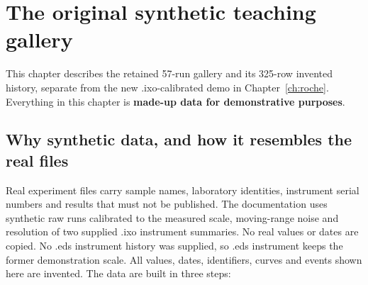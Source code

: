 \chapter{The original synthetic teaching gallery}\label{ch:data}

\begin{notebox}
This chapter describes the retained 57-run gallery and its 325-row invented history, separate from the new .ixo-calibrated demo in Chapter~\ref{ch:roche}. Everything in this chapter is \textbf{made-up data for demonstrative purposes}.
\end{notebox}

\section{Why synthetic data, and how it resembles the real files}
Real experiment files carry sample names, laboratory identities, instrument serial numbers and results that must not be
published. The documentation uses synthetic raw runs calibrated to the measured scale, moving-range noise and resolution
of two supplied .ixo instrument summaries. No real values or dates are copied. No .eds instrument history was supplied, so
.eds instrument keeps the former demonstration scale. All values, dates, identifiers, curves and events shown here are invented.
The data are built in three steps:

